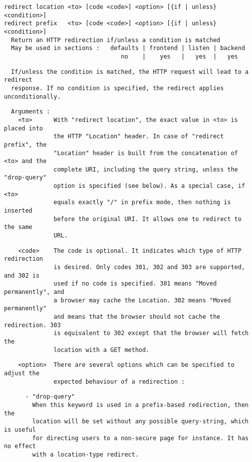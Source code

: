 \begin{verbatim}
redirect location <to> [code <code>] <option> [{if | unless} <condition>]
redirect prefix   <to> [code <code>] <option> [{if | unless} <condition>]
  Return an HTTP redirection if/unless a condition is matched
  May be used in sections :   defaults | frontend | listen | backend
                                 no    |    yes   |   yes  |   yes
\end{verbatim}

\begin{verbatim}
  If/unless the condition is matched, the HTTP request will lead to a redirect
  response. If no condition is specified, the redirect applies unconditionally.
\end{verbatim}

\begin{verbatim}
  Arguments :
    <to>      With "redirect location", the exact value in <to> is placed into
              the HTTP "Location" header. In case of "redirect prefix", the
              "Location" header is built from the concatenation of <to> and the
              complete URI, including the query string, unless the "drop-query"
              option is specified (see below). As a special case, if <to>
              equals exactly "/" in prefix mode, then nothing is inserted
              before the original URI. It allows one to redirect to the same
              URL.
\end{verbatim}

\begin{verbatim}
    <code>    The code is optional. It indicates which type of HTTP redirection
              is desired. Only codes 301, 302 and 303 are supported, and 302 is
              used if no code is specified. 301 means "Moved permanently", and
              a browser may cache the Location. 302 means "Moved permanently"
              and means that the browser should not cache the redirection. 303
              is equivalent to 302 except that the browser will fetch the
              location with a GET method.
\end{verbatim}

\begin{verbatim}
    <option>  There are several options which can be specified to adjust the
              expected behaviour of a redirection :
\end{verbatim}

\begin{verbatim}
      - "drop-query"
        When this keyword is used in a prefix-based redirection, then the
        location will be set without any possible query-string, which is useful
        for directing users to a non-secure page for instance. It has no effect
        with a location-type redirect.
\end{verbatim}

